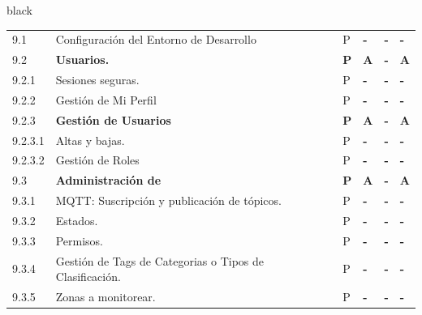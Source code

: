 \documentclass[11pt]{charter}
\begin{document}
\begin{consigna}{black}
\begin{tabularx}{\linewidth}{@{}|p{1.3cm}|p{10cm}|p{3cm}|p{3cm}|p{3cm}|p{3cm}|@{}}
9.1                    & Configuración del Entorno de   Desarrollo                                                     & P          & \textbf{-} & \textbf{-} & \textbf{-} \\
9.2                    & \textbf{Usuarios.}                                                                            & \textbf{P} & \textbf{A} & \textbf{-} & \textbf{A} \\
9.2.1                  & Sesiones seguras.                                                                             & P          & \textbf{-} & \textbf{-} & \textbf{-} \\
9.2.2                  & Gestión de Mi Perfil                                                                          & P          & \textbf{-} & \textbf{-} & \textbf{-} \\
9.2.3                  & \textbf{Gestión de Usuarios}                                                                  & \textbf{P} & \textbf{A} & \textbf{-} & \textbf{A} \\
9.2.3.1                & Altas y bajas.                                                                                & P          & \textbf{-} & \textbf{-} & \textbf{-} \\
9.2.3.2                & Gestión de Roles                                                                              & P          & \textbf{-} & \textbf{-} & \textbf{-} \\
9.3                    & \textbf{Administración de}                                                                    & \textbf{P} & \textbf{A} & \textbf{-} & \textbf{A} \\
9.3.1                  & MQTT: Suscripción y publicación   de tópicos.                                                 & P          & \textbf{-} & \textbf{-} & \textbf{-} \\
9.3.2                  & Estados.                                                                                      & P          & \textbf{-} & \textbf{-} & \textbf{-} \\
9.3.3                  & Permisos.                                                                                     & P          & \textbf{-} & \textbf{-} & \textbf{-} \\
9.3.4                  & Gestión de Tags de Categorias o   Tipos de Clasificación.                                     & P          & \textbf{-} & \textbf{-} & \textbf{-} \\
9.3.5                  & Zonas a monitorear.                                                                           & P          & \textbf{-} & \textbf{-} & \textbf{-} \\

\end{tabularx}
\end{consigna}
\end{document}
